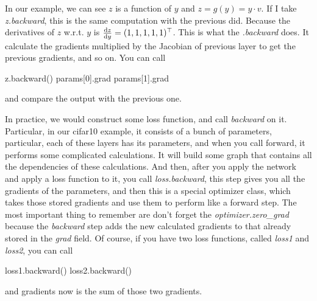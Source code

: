 In our example, we can see $z$ is a function of $y$ and $z = g(y) = y \cdot v$.
If I take \emph{z.backward}, this is the same computation with the previous did. Because the derivatives of $z$ w.r.t. $y$ is $\frac{{\rm d} z}{{\rm d}y} = (1,1,1,1,1)^\top$. This is what the \emph{.backward} does. It calculate the gradients multiplied by the Jacobian of previous layer to get the previous gradients, and so on.
You can call 
\begin{python}
z.backward()
params[0].grad
params[1].grad
\end{python}
and compare the output with the previous one. 

In practice, we would construct some loss function, and call \emph{backward} on it. Particular, in our cifar10 example, it consists of a bunch of parameters, particular, each of these layers has its parameters, and when you call forward, it performs some complicated calculations. It will build some graph that contains all the dependencies of these calculations. And then, after you apply the network
and apply a loss function to it, you call \emph{loss.backward}, this step gives you all the gradients of the parameters, and then this is a special optimizer class, which takes those stored gradients and use them to perform like a forward step. 
The most important thing to remember are don't forget the \emph{optimizer.zero\_grad} because the \emph{backward} step adds the new calculated gradients to that already stored in the \emph{grad} field. Of course, if you have two loss functions, called \emph{loss1} and \emph{loss2}, you can call 
\begin{python}
loss1.backward()
loss2.backward()
\end{python}
and gradients now is the sum of those two gradients.
